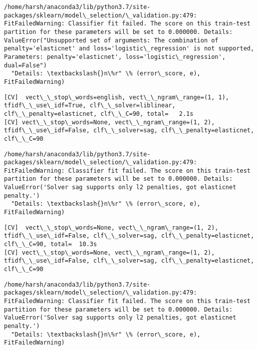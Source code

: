 \documentclass[11pt]{article}
\begin{document}
    \begin{Verbatim}[commandchars=\\\{\}]
/home/harsh/anaconda3/lib/python3.7/site-packages/sklearn/model\_selection/\_validation.py:479: FitFailedWarning: Classifier fit failed. The score on this train-test partition for these parameters will be set to 0.000000. Details: 
ValueError("Unsupported set of arguments: The combination of penalty='elasticnet' and loss='logistic\_regression' is not supported, Parameters: penalty='elasticnet', loss='logistic\_regression', dual=False")
  "Details: \textbackslash{}n\%r" \% (error\_score, e), FitFailedWarning)

    \end{Verbatim}

    \begin{Verbatim}[commandchars=\\\{\}]
[CV]  vect\_\_stop\_words=english, vect\_\_ngram\_range=(1, 1), tfidf\_\_use\_idf=True, clf\_\_solver=liblinear, clf\_\_penalty=elasticnet, clf\_\_C=90, total=   2.1s
[CV] vect\_\_stop\_words=None, vect\_\_ngram\_range=(1, 2), tfidf\_\_use\_idf=False, clf\_\_solver=sag, clf\_\_penalty=elasticnet, clf\_\_C=90 

    \end{Verbatim}

    \begin{Verbatim}[commandchars=\\\{\}]
/home/harsh/anaconda3/lib/python3.7/site-packages/sklearn/model\_selection/\_validation.py:479: FitFailedWarning: Classifier fit failed. The score on this train-test partition for these parameters will be set to 0.000000. Details: 
ValueError('Solver sag supports only l2 penalties, got elasticnet penalty.')
  "Details: \textbackslash{}n\%r" \% (error\_score, e), FitFailedWarning)

    \end{Verbatim}

    \begin{Verbatim}[commandchars=\\\{\}]
[CV]  vect\_\_stop\_words=None, vect\_\_ngram\_range=(1, 2), tfidf\_\_use\_idf=False, clf\_\_solver=sag, clf\_\_penalty=elasticnet, clf\_\_C=90, total=  10.3s
[CV] vect\_\_stop\_words=None, vect\_\_ngram\_range=(1, 2), tfidf\_\_use\_idf=False, clf\_\_solver=sag, clf\_\_penalty=elasticnet, clf\_\_C=90 

    \end{Verbatim}

    \begin{Verbatim}[commandchars=\\\{\}]
/home/harsh/anaconda3/lib/python3.7/site-packages/sklearn/model\_selection/\_validation.py:479: FitFailedWarning: Classifier fit failed. The score on this train-test partition for these parameters will be set to 0.000000. Details: 
ValueError('Solver sag supports only l2 penalties, got elasticnet penalty.')
  "Details: \textbackslash{}n\%r" \% (error\_score, e), FitFailedWarning)

    \end{Verbatim}
\end{document}
